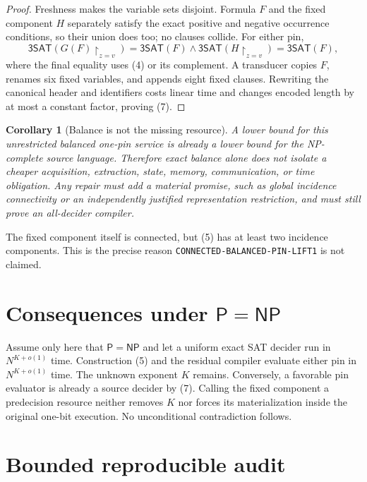 \documentclass[11pt]{article}
\newtheorem{corollary}[theorem]{Corollary}
\newcommand{\SAT}{\mathsf{3SAT}}
\begin{document}
\begin{proof}
Freshness makes the variable sets disjoint.  Formula $F$ and the fixed
component $H$ separately satisfy the exact positive and negative occurrence
conditions, so their union does too; no clauses collide.  For either pin,
\[
 \SAT(G(F)\upharpoonright_{z=v})
 =\SAT(F)\wedge\SAT(H\upharpoonright_{z=v})=\SAT(F),         \tag{8}
\]
where the final equality uses (4) or its complement.  A transducer copies
$F$, renames six fixed variables, and appends eight fixed clauses.  Rewriting
the canonical header and identifiers costs linear time and changes encoded
length by at most a constant factor, proving (7).
\end{proof}

\begin{corollary}[Balance is not the missing resource]
A lower bound for this unrestricted balanced one-pin service is already a
lower bound for the NP-complete source language.  Therefore exact balance
alone does not isolate a cheaper acquisition, extraction, state, memory,
communication, or time obligation.  Any repair must add a material promise,
such as global incidence connectivity or an independently justified
representation restriction, and must still prove an all-decider compiler.
\end{corollary}

The fixed component itself is connected, but (5) has at least two incidence
components.  This is the precise reason \texttt{CONNECTED-BALANCED-PIN-LIFT1}
is not claimed.

\section{Consequences under $\mathsf P=\mathsf{NP}$}

Assume only here that $\mathsf P=\mathsf{NP}$ and let a uniform exact SAT
decider run in $N^{K+o(1)}$ time.  Construction (5) and the residual compiler
evaluate either pin in $N^{K+o(1)}$ time.  The unknown exponent $K$ remains.
Conversely, a favorable pin evaluator is already a source decider by (7).
Calling the fixed component a predecision resource neither removes $K$ nor
forces its materialization inside the original one-bit execution.  No
unconditional contradiction follows.

\section{Bounded reproducible audit}
\end{document}
